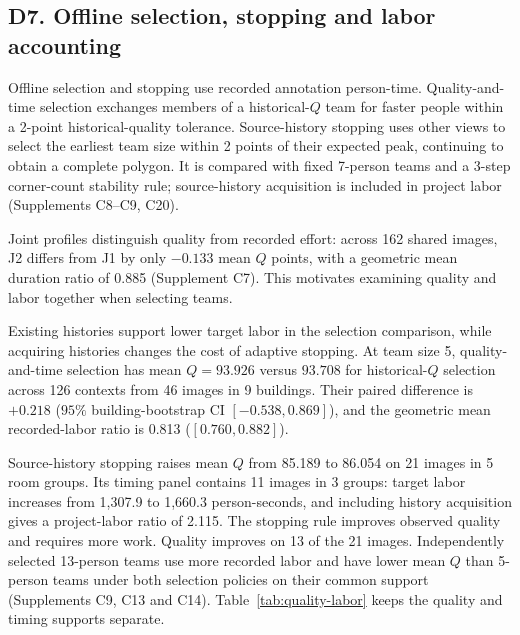 \subsection*{D7. Offline selection, stopping and labor accounting}
\label{supp:d7-labor}
\label{sec:labor-history}

Offline selection and stopping use recorded annotation person-time. Quality-and-time selection exchanges members of a historical-$Q$ team for faster people within a 2-point historical-quality tolerance. Source-history stopping uses other views to select the earliest team size within 2 points of their expected peak, continuing to obtain a complete polygon. It is compared with fixed 7-person teams and a 3-step corner-count stability rule; source-history acquisition is included in project labor (Supplements C8--C9, C20).

Joint profiles distinguish quality from recorded effort: across 162 shared images, J2 differs from J1 by only $-0.133$ mean $Q$ points, with a geometric mean duration ratio of 0.885 (Supplement C7). This motivates examining quality and labor together when selecting teams.

Existing histories support lower target labor in the selection comparison, while acquiring histories changes the cost of adaptive stopping. At team size 5, quality-and-time selection has mean $Q=93.926$ versus $93.708$ for historical-$Q$ selection across 126 contexts from 46 images in 9 buildings. Their paired difference is $+0.218$ ($95\%$ building-bootstrap CI $[-0.538,0.869]$), and the geometric mean recorded-labor ratio is 0.813 ($[0.760,0.882]$).

Source-history stopping raises mean $Q$ from 85.189 to 86.054 on 21 images in 5 room groups. Its timing panel contains 11 images in 3 groups: target labor increases from 1,307.9 to 1,660.3 person-seconds, and including history acquisition gives a project-labor ratio of 2.115. The stopping rule improves observed quality and requires more work. Quality improves on 13 of the 21 images. Independently selected 13-person teams use more recorded labor and have lower mean $Q$ than 5-person teams under both selection policies on their common support (Supplements C9, C13 and C14). Table~\ref{tab:quality-labor} keeps the quality and timing supports separate.
